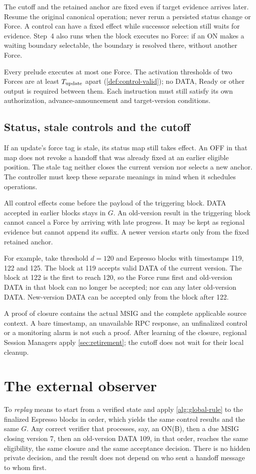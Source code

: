 \documentclass[11pt,a4paper]{article}
\begin{document}
The cutoff and the retained anchor are fixed even if target evidence
arrives later. Resume the original canonical operation; never rerun a
persisted status change or Force. A control can have a fixed effect while
successor selection still waits for evidence. Step~4 also runs when the
block executes no Force: if an ON makes a waiting boundary selectable,
the boundary is resolved there, without another Force.

Every prelude executes at most one Force. The activation thresholds of
two Forces are at least $T_{\rm update}$ apart
(\cref{def:control-valid}); no DATA, Ready or other output is required
between them.
Each instruction must still satisfy its own authorization,
advance-announcement and target-version conditions.

\subsection{Status, stale controls and the cutoff}
If an update's force tag is stale, its status map still takes effect.
An OFF in that map does not revoke a handoff that was already fixed at
an earlier eligible position. The stale tag neither closes the current version nor selects a new
anchor. The controller must keep these separate meanings in mind when it
schedules operations.

All control effects come before the payload of the triggering block.
DATA accepted in earlier blocks stays in $G$. An old-version result in
the triggering block cannot cancel a Force by arriving with late
progress. It may be kept as regional evidence but cannot append its
suffix. A newer version starts only from the fixed retained anchor.

For example, take threshold $d=120$ and Espresso blocks with timestamps
119, 122 and 125. The block at 119 accepts valid DATA of the current
version. The block at 122 is the first to reach 120, so the Force runs
first and old-version DATA in that block can no longer be accepted;
nor can any later old-version DATA. New-version DATA can be accepted only
from the block after 122.

A proof of closure contains the actual MSIG and the complete applicable
source context. A bare timestamp, an unavailable RPC response, an
unfinalized control or a monitoring alarm is not such a proof. After
learning of the closure, regional Session Managers apply
\cref{sec:retirement}; the cutoff does not wait for their local cleanup.

\section{The external observer}
\label{sec:observers}
To \emph{replay} means to start from a verified state and apply
\cref{alg:global-rule} to the finalized Espresso blocks in order, which
yields the same control results and the same $G$. Any correct verifier that processes, say, an
ON(B), then a due MSIG closing version 7, then an old-version DATA 109,
in that order, reaches the same eligibility, the same closure and the
same acceptance decision. There is no hidden private decision, and the
result does not depend on who sent a handoff message to whom first.
\end{document}
